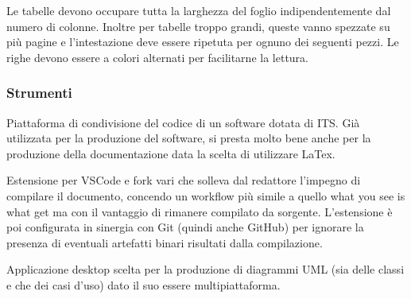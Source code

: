     Le tabelle devono occupare tutta la larghezza del foglio indipendentemente dal numero di colonne.
    Inoltre per tabelle troppo grandi, queste vanno spezzate su più pagine e l'intestazione deve essere ripetuta
    per ognuno dei seguenti pezzi.
    Le righe devono essere a colori alternati per facilitarne la lettura.

\subsubsection{Strumenti}

    Piattaforma di condivisione del codice di un software dotata di ITS. Già utilizzata per la produzione del software, si presta
    molto bene anche per la produzione della documentazione data la scelta di utilizzare LaTex.

    Estensione per VSCode e fork vari che solleva dal redattore l'impegno di compilare il documento, concendo un workflow più simile
    a quello what you see is what get ma con il vantaggio di rimanere compilato da sorgente.
    L'estensione è poi configurata in sinergia con Git (quindi anche GitHub) per ignorare la presenza di eventuali artefatti binari
    risultati dalla compilazione.

    Applicazione desktop scelta per la produzione di diagrammi UML (sia delle classi e che dei casi d'uso) dato il suo essere
    multipiattaforma.
